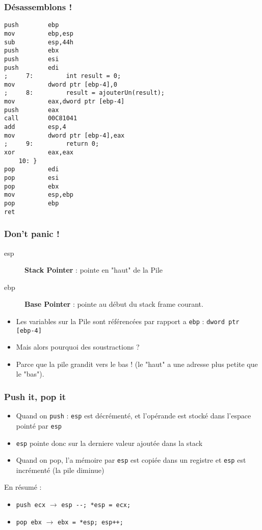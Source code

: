 \documentclass{beamer}
\begin{document}
\begin{frame}[fragile]
\frametitle{Désassemblons !}
\begin{lstlisting}[language={[x86masm]Assembler}, basicstyle={\scriptsize\ttfamily}]
push        ebp  
mov         ebp,esp  
sub         esp,44h  
push        ebx  
push        esi  
push        edi  
;     7:         int result = 0;
mov         dword ptr [ebp-4],0  
;     8:         result = ajouterUn(result);
mov         eax,dword ptr [ebp-4]  
push        eax  
call        00C81041  
add         esp,4  
mov         dword ptr [ebp-4],eax  
;     9:         return 0;
xor         eax,eax  
    10: }
pop         edi  
pop         esi  
pop         ebx  
mov         esp,ebp  
pop         ebp  
ret  
\end{lstlisting}
\end{frame}
\begin{frame}[fragile]
\frametitle{Don't panic !}
\begin{description}
\item[esp]  \textbf{Stack Pointer} : pointe en "haut" de la Pile 
\item[ebp]  \textbf{Base Pointer} : pointe au début du stack frame courant.
\end{description}
\begin{itemize}
\item Les variables sur la Pile sont référencées par rapport a \texttt{ebp} : \lstinline[language={[x86masm]Assembler}]+dword ptr [ebp-4]+ 
\item Mais alors pourquoi des soustractions ?
\pause
\item Parce que la pile grandit vers le bas ! (le "haut" a une adresse plus petite que le "bas").
\end{itemize}
\end{frame}

\begin{frame}[fragile]
\frametitle{Push it, pop it}
\begin{itemize}
\item Quand on \texttt{push} : \texttt{esp} est décrémenté, et l'opérande est stocké dans l'espace pointé par \texttt{esp}
\item \texttt{esp} pointe donc sur la derniere valeur ajoutée dans la stack
\item Quand on pop, l'a mémoire par \texttt{esp} est copiée dans un registre et \texttt{esp} est incrémenté (la pile diminue)
\end{itemize}
\pause
En résumé :
\begin{itemize}
\item  \lstinline[language={[x86masm]Assembler}]+push ecx+ $\rightarrow$ \lstinline+esp --; *esp = ecx;+ 
\item  \lstinline[language={[x86masm]Assembler}]+pop ebx+ $\rightarrow$  \lstinline!ebx = *esp; esp++;!
\end{itemize}
\end{frame}
\end{document}
